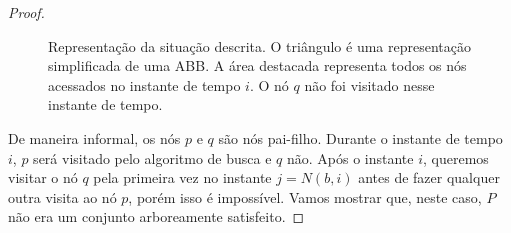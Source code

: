 \begin{proof}

\begin{figure}[H]
    \caption{Representação da situação descrita. O triângulo é uma representação simplificada de uma ABB. A área destacada representa todos os nós acessados no instante de tempo $i$. O nó $q$ não foi visitado nesse instante de tempo.}
\label{fig:representacao_grafica}
\end{figure}

De maneira informal, os nós $p$ e $q$ são nós pai-filho. Durante o instante de tempo $i$, $p$ será visitado pelo algoritmo de busca e $q$ não. Após o instante $i$, queremos visitar o nó $q$ pela primeira vez no instante $j = N(b,i)$ antes de fazer qualquer outra visita ao nó $p$, porém isso é impossível. Vamos mostrar que, neste caso, $P$ não era um conjunto arboreamente satisfeito.


\end{proof}
